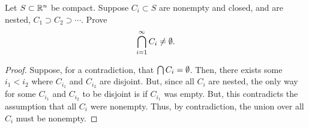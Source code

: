 \documentclass[../quiz3]{subfiles}
\begin{document}
\begin{problem}[4]
Let $S\subset \mathbb{R}^{n}$ be compact. Suppose $C_i\subset S$ are nonempty and closed, and are nested, $C_1 \supset C_2 \supset \cdots$. Prove \[
	\bigcap_{i=1}^{\infty}C_i \neq \emptyset
	.\]
\end{problem}
\begin{proof}
	Suppose, for a contradiction, that $\bigcap C_i = \emptyset$. Then, there exists some $i_1<i_2$ where $C_{i_1}$ and  $C_{i_2}$ are disjoint. But, since all $C_i$ are nested, the only way for some  $C_{i_1}$ and  $C_{i_2}$ to be disjoint is if $C_{i_1}$ was empty. But, this contradicts the assumption that all $C_i$ were nonempty. Thus, by contradiction, the union over all  $C_i$ must be nonempty.
\end{proof}
\end{document}
